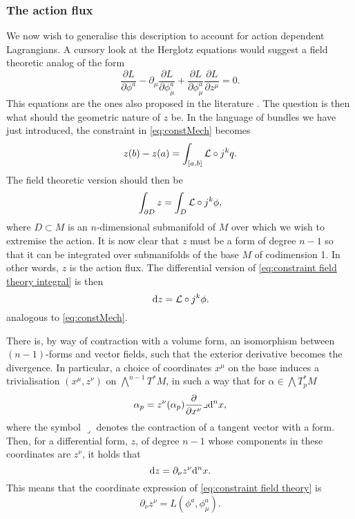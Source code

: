 \documentclass[../main.tex]{subfiles}
\begin{document}
\subsubsection{The action flux}
We now wish to generalise this description to account for action dependent Lagrangians. A cursory look at the Herglotz equations would suggest a field theoretic analog of the form 
\begin{equation}
	\frac{\partial L}{\partial \phi^a} - \partial_\mu \frac{\partial L}{\partial
\phi ^a_\mu} + \frac{\partial L}{\partial \phi^a_\mu}\frac{\partial
L}{\partial z^\mu} = 0. 
\end{equation}
This equations are the ones also proposed in the literature \cite{Gaset2020a,Lazo2018,de_leon_multicontact_2022}. The question is then what should the geometric nature of \(z\) be. In the language of bundles we have just introduced, the constraint in \cref{eq:constMech} becomes
\begin{equation}\label{eq:constraint field theory integral}
    z(b) - z(a) = \int_{[a,b]}  \mathcal{L} \circ j^kq.
\end{equation}
The field theoretic version should then be 
\begin{equation}
    \int_{\partial D}z = \int_D  \mathcal{L} \circ j^k\phi,
\end{equation}
where $D\subset M$ is an $n$-dimensional submanifold of \(M\) over which we wish to extremise the action. It is now clear that \(z\) must be a form of degree \(n-1\) so that it can be integrated over submanifolds of the base \(M\) of codimension 1. In other words, \(z\) is the action flux. The differential version of \cref{eq:constraint field theory integral} is then
\begin{equation} \label{eq:constraint field theory}
\,\mathrm{d} z =  \mathcal{L} \circ j^k\phi.
\end{equation}
analogous to \cref{eq:constMech}. 

There is, by way of contraction with a volume form, an isomorphism between \((n-1)\)-forms and vector fields, such that the exterior derivative becomes the divergence. In particular, a choice of coordinates \(x^\mu\) on the base induces a trivialisation \((x^\mu,z^\nu)\) on \(\bigwedge^{n-1} T^\ast M\), in such a way that for \(\alpha \in \bigwedge T^\ast _p M\)
\begin{equation}\label{eq:coordinates flux}
\alpha_p = z^\nu(\alpha_p) \frac{\partial}{\partial x^\nu} \lrcorner \mathrm{d}^n x,
\end{equation}
where the symbol \(\lrcorner \) denotes the contraction of a tangent vector with a form. Then, for a differential form, \(z\), of degree \(n-1\) whose components in these coordinates are \(z^\nu\), it holds that
\begin{equation}
    \mathrm{d} z = \partial_\nu z^\nu \mathrm{d}^nx.
\end{equation}
This means that the coordinate expression of \cref{eq:constraint field theory} is 
\begin{equation} \label{eq:constraint field theory coordinates}
	\partial_\nu z^\nu = L(\phi^a, \phi^a_\mu).
\end{equation}
\end{document}
